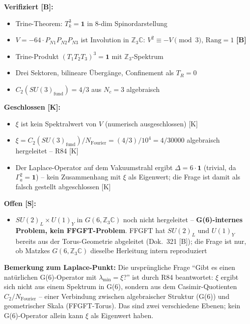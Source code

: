 \begin{keyresult}
\textbf{Verifiziert [B]:}
\begin{itemize}
  \item Trine-Theorem: $T_k^3 = \mathbf{1}$ in 8-dim Spinordarstellung
  \item $V = -64\cdot P_{N1}P_{N2}P_{N3}$ ist Involution in $\mathbb{Z}_3\mathbb{C}$: $V^2 \equiv -V \pmod{3}$, $\mathrm{Rang}=1$ \textbf{[B]}
  \item Trine-Produkt $(T_1T_2T_3)^3 = \mathbf{1}$ mit $\mathbb{Z}_3$-Spektrum
  \item Drei Sektoren, bilineare Übergänge, Confinement als $T_R = 0$
  \item $C_2(SU(3)_{\text{fund}}) = 4/3$ aus $N_c = 3$ algebraisch
\end{itemize}
\textbf{Geschlossen [K]:}
\begin{itemize}
  \item $\xi$ ist kein Spektralwert von $V$ (numerisch ausgeschlossen) [K]
  \item $\xi = C_2(SU(3)_{\text{fund}})/N_{\text{Fourier}} = (4/3)/10^4 = 4/30000$
    algebraisch hergeleitet -- R84 [K]
  \item Der Laplace-Operator auf dem Vakuumstrahl ergibt $\Delta = 6\cdot\mathbf{1}$
    (trivial, da $\Gamma_a^2 = \mathbf{1}$) -- kein Zusammenhang mit $\xi$
    als Eigenwert; die Frage ist damit als falsch gestellt abgeschlossen [K]
\end{itemize}
\textbf{Offen [S]:}
\begin{itemize}
  \item $SU(2)_L\times U(1)_Y$ in $G(6,\mathbb{Z}_3\mathbb{C})$
    noch nicht hergeleitet -- \textbf{G(6)-internes Problem, kein FFGFT-Problem}.
    FFGFT hat $SU(2)_L$ und $U(1)_Y$ bereits aus der Torus-Geometrie
    abgeleitet (Dok.~321 [B]); die Frage ist nur, ob Matzkes
    $G(6,\mathbb{Z}_3\mathbb{C})$ dieselbe Herleitung intern reproduziert
\end{itemize}
\textbf{Bemerkung zum Laplace-Punkt:} Die ursprüngliche Frage
``Gibt es einen natürlichen G(6)-Operator mit $\lambda_{\min} = \xi$?''
ist durch R84 beantwortet: $\xi$ ergibt sich nicht aus einem Spektrum
in G(6), sondern aus dem Casimir-Quotienten $C_2/N_{\text{Fourier}}$ --
einer Verbindung zwischen algebraischer Struktur (G(6)) und geometrischer
Skala (FFGFT-Torus). Das sind zwei verschiedene Ebenen; kein G(6)-Operator
allein kann $\xi$ als Eigenwert haben.
\end{keyresult}


